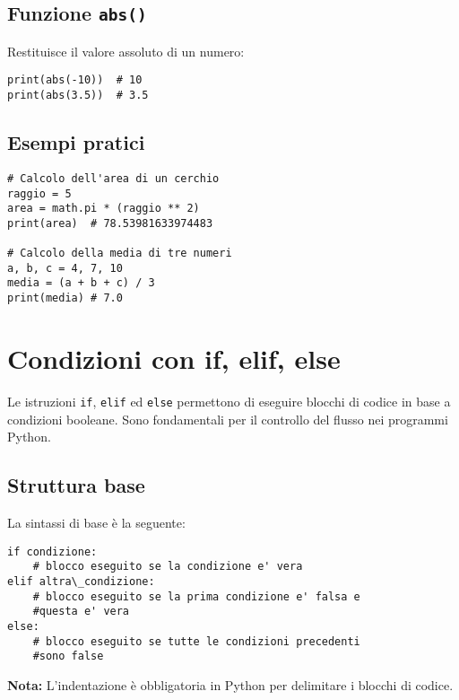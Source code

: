 \documentclass[a4paper,12pt]{article}
\begin{document}
\subsection*{Funzione \texttt{abs()}}
Restituisce il valore assoluto di un numero:
\begin{lstlisting}
print(abs(-10))  # 10
print(abs(3.5))  # 3.5
\end{lstlisting}

\subsection*{Esempi pratici}
\begin{lstlisting}
# Calcolo dell'area di un cerchio
raggio = 5
area = math.pi * (raggio ** 2)
print(area)  # 78.53981633974483

# Calcolo della media di tre numeri
a, b, c = 4, 7, 10
media = (a + b + c) / 3
print(media) # 7.0
\end{lstlisting}

\begin{center}
\end{center}

\section{Condizioni con if, elif, else}
Le istruzioni \texttt{if}, \texttt{elif} ed \texttt{else} permettono di eseguire blocchi di codice in base a condizioni booleane. Sono fondamentali per il controllo del flusso nei programmi Python.

\subsection*{Struttura base}

La sintassi di base è la seguente:
\begin{lstlisting}
if condizione:
    # blocco eseguito se la condizione e' vera
elif altra\_condizione:
    # blocco eseguito se la prima condizione e' falsa e
    #questa e' vera
else:
    # blocco eseguito se tutte le condizioni precedenti
    #sono false
\end{lstlisting}

\textbf{Nota:} L'indentazione è obbligatoria in Python per delimitare i blocchi di codice.
\end{document}
